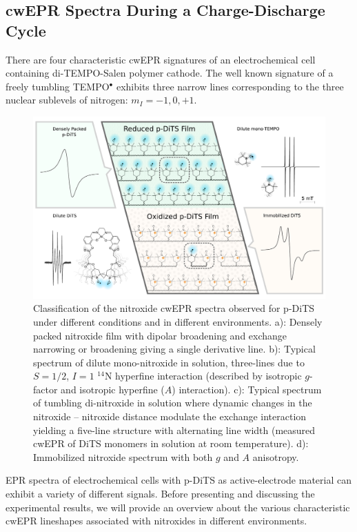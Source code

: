 \subsection{cwEPR Spectra During a Charge-Discharge Cycle}
There are four characteristic cwEPR signatures of an electrochemical cell containing di-TEMPO-Salen polymer cathode. The well known signature of a freely tumbling TEMPO$^{\bullet}$ exhibits three narrow lines corresponding to the three nuclear sublevels of nitrogen: $m_I=-1,0,+1$.
\begin{figure}[h]
\center
	\includegraphics[width=1\textwidth]{./operando_epr/figures/Cartoon_ALL.pdf}
	\caption{Classification of the nitroxide cwEPR spectra observed for p-DiTS under different conditions and in different environments. a): Densely packed nitroxide film with dipolar broadening and exchange narrowing or broadening giving a single derivative line. b): Typical spectrum of dilute mono-nitroxide in solution, three-lines due to $S=1/2$, $I=1$ $^{14}$N hyperfine interaction (described by isotropic $g$-factor and isotropic hyperfine ($A$) interaction). c): Typical spectrum of tumbling di-nitroxide in solution where dynamic changes in the nitroxide -- nitroxide distance modulate the exchange interaction yielding a five-line structure with alternating line width (measured cwEPR of DiTS monomers in solution at room temperature). d): Immobilized nitroxide spectrum with both $g$ and $A$ anisotropy.}
	\label{fig:cartoon_spectra_dts}
\end{figure}


EPR spectra of electrochemical cells with p-DiTS as active-electrode material can exhibit a variety of different signals. Before presenting and discussing the experimental results, we will provide an overview about the various characteristic cwEPR lineshapes associated with nitroxides in different environments.
\par

